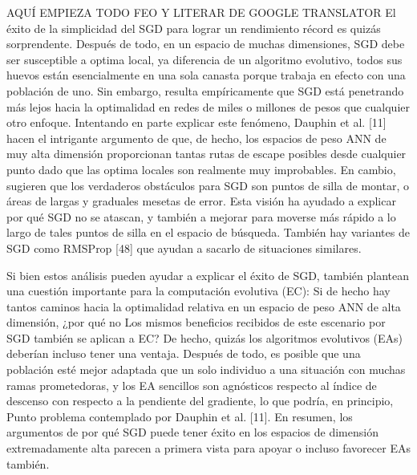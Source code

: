 {\Huge AQUÍ EMPIEZA TODO FEO Y LITERAR DE GOOGLE TRANSLATOR}\newline
El éxito de la simplicidad del SGD para lograr un rendimiento récord es quizás sorprendente. Después de todo, en un espacio de muchas dimensiones, SGD debe ser susceptible a optima local, ya diferencia de un algoritmo evolutivo, todos sus huevos están esencialmente en una sola canasta porque trabaja en efecto con una población de uno. Sin embargo, resulta empíricamente que SGD está penetrando más lejos hacia la optimalidad en redes de miles o millones de pesos que cualquier otro enfoque. Intentando en parte explicar este fenómeno, Dauphin et al. [11] hacen el intrigante argumento de que, de hecho, los espacios de peso ANN de muy alta dimensión proporcionan tantas rutas de escape posibles desde cualquier punto dado que las optima locales son realmente muy improbables. En cambio, sugieren que los verdaderos obstáculos para SGD son puntos de silla de montar, o áreas de largas y graduales mesetas de error. Esta visión ha ayudado a explicar por qué SGD no se atascan, y también a mejorar para moverse más rápido a lo largo de tales puntos de silla en el espacio de búsqueda. También hay variantes de SGD como RMSProp [48] que ayudan a sacarlo de situaciones similares.

Si bien estos análisis pueden ayudar a explicar el éxito de SGD, también plantean una cuestión importante para la computación evolutiva (EC): Si de hecho hay tantos caminos hacia la optimalidad relativa en un espacio de peso ANN de alta dimensión, ¿por qué no Los mismos beneficios recibidos de este escenario por SGD también se aplican a EC? De hecho, quizás los algoritmos evolutivos (EAs) deberían incluso tener una ventaja. Después de todo, es posible que una población esté mejor adaptada que un solo individuo a una situación con muchas ramas prometedoras, y los EA sencillos son agnósticos respecto al índice de descenso con respecto a la pendiente del gradiente, lo que podría, en principio, Punto problema contemplado por Dauphin et al. [11]. En resumen, los argumentos de por qué SGD puede tener éxito en los espacios de dimensión extremadamente alta parecen a primera vista para apoyar o incluso favorecer EAs también.

